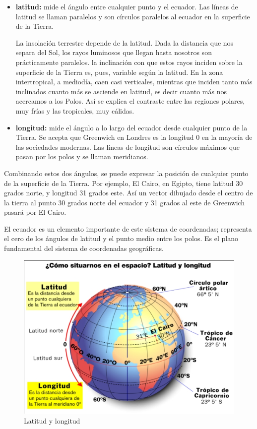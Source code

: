 \begin{itemize}
\item {\bf\Gls{latitud}:} mide el \'angulo entre cualquier punto y el ecuador. Las
  l\'ineas de latitud se llaman paralelos y son c\'irculos paralelos al
  ecuador en la superficie de la Tierra.

  La insolaci\'on terrestre depende de la latitud. Dada la distancia que
  nos separa del Sol, los rayos luminosos que llegan hasta nosotros
  son pr\'acticamente paralelos. la inclinaci\'on con que estos rayos
  inciden sobre la superficie de la Tierra es, pues, variable seg\'un la
  latitud. En la zona intertropical, a mediod\'ia, caen casi verticales,
  mientras que inciden tanto m\'as inclinados cuanto m\'as se asciende en
  latitud, es decir cuanto m\'as nos acercamos a los Polos. As\'i se
  explica el contraste entre las regiones polares, muy fr\'ias y las
  tropicales, muy c\'alidas.


\item {\bf \Gls{longitud}:} mide el \'angulo a lo largo del ecuador desde cualquier   punto de la Tierra. Se acepta que Greenwich en Londres es la
  longitud 0 en la mayor\'ia de las sociedades modernas. Las l\'ineas de
  longitud son c\'irculos m\'aximos que pasan por los polos y se llaman
  meridianos.
\end{itemize}


Combinando estos dos \'angulos, se puede expresar la posici\'on de cualquier punto de la superficie de la Tierra. Por ejemplo, El Cairo, en Egipto, tiene latitud 30 grados norte, y longitud 31 grados este. As\'i un vector dibujado desde el centro de la tierra al punto 30 grados norte del ecuador y 31 grados al este de Greenwich pasar\'a por El Cairo.

El ecuador es un elemento importante de este sistema de coordenadas; representa el cero de los \'angulos de latitud y el punto medio entre los polos. Es el plano fundamental del sistema de coordenadas geogr\'aficas.

\begin{figure}[!h]
  \centering
  \includegraphics[width=\textwidth]{./Imagenes/06.00.navegacion/latitud_longitud.jpg}
  \caption{Latitud y longitud}
  \label{fig:latitud-longitud}
\end{figure}

